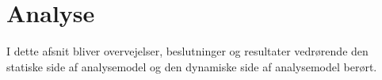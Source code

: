 \section{Analyse}
I dette afsnit bliver overvejelser, beslutninger og resultater vedrørende den statiske side af analysemodel og den dynamiske side af analysemodel berørt. 


\newpage


\newpage